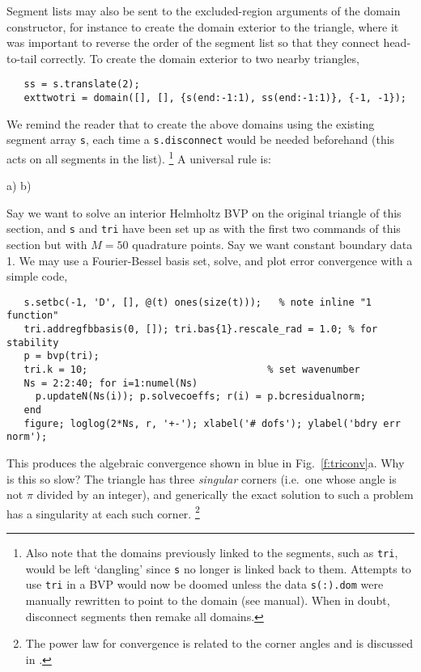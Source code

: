 Segment lists may also be sent to the excluded-region arguments of the
domain constructor, for instance to create the domain exterior
to the triangle,
where it was important to reverse the order of the segment list
so that they connect head-to-tail correctly.
To create the domain exterior to two nearby triangles,
\begin{verbatim}
   ss = s.translate(2);
   exttwotri = domain([], [], {s(end:-1:1), ss(end:-1:1)}, {-1, -1});
\end{verbatim}
We remind the reader that to create the above domains
using the existing segment array {\tt s}, each time a {\tt s.disconnect}
would be needed beforehand (this acts on all segments in the list).%
  \footnote{Also note that the domains previously linked to the segments, such
    as {\tt tri}, would be left `dangling' since {\tt s} no longer is linked
    back to them. Attempts to use {\tt tri} in a BVP would now be doomed
    unless the data {\tt s(:).dom} were manually rewritten to point to
    the domain (see manual). When in doubt, disconnect segments then remake
    all domains.}
A universal rule is:
\begin{center}\end{center}

\bfi %
a)
b)
\efi

Say we want to solve an interior Helmholtz BVP on the original triangle
of this section, and {\tt s} and {\tt tri} have been set up as with the
first two commands of this section but with $M=50$ quadrature points.
Say we want constant boundary data 1.
We may use a Fourier-Bessel basis set, solve, and
plot error convergence with a simple code,
\begin{verbatim}
   s.setbc(-1, 'D', [], @(t) ones(size(t)));   % note inline "1 function"
   tri.addregfbbasis(0, []); tri.bas{1}.rescale_rad = 1.0; % for stability
   p = bvp(tri);
   tri.k = 10;                               % set wavenumber
   Ns = 2:2:40; for i=1:numel(Ns)
     p.updateN(Ns(i)); p.solvecoeffs; r(i) = p.bcresidualnorm;
   end
   figure; loglog(2*Ns, r, '+-'); xlabel('# dofs'); ylabel('bdry err norm');
\end{verbatim}
This produces the algebraic convergence
shown in blue in Fig.~\ref{f:triconv}a.
Why is this so slow? The triangle has three {\em singular} corners
(i.e.\ one whose angle is not $\pi$ divided by an integer), and
generically the exact solution to
such a problem has a singularity at each such corner.%
  \footnote{The power law for convergence is related to the corner
    angles and is discussed in \cite{Ei74}.}

